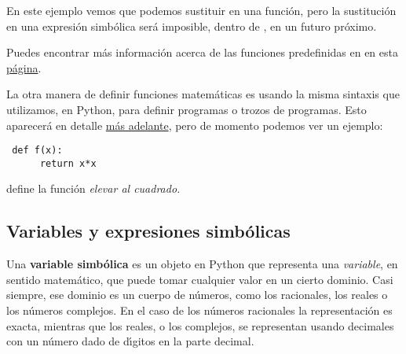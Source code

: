 En este ejemplo vemos que podemos sustituir en una funci\'on, pero la
sustituci\'on en una expresi\'on simb\'olica ser\'a imposible, dentro de
{\sage}, 
en un futuro
pr\'oximo.
 
 
Puedes encontrar m\'as informaci\'on acerca de las funciones predefinidas en
{\sage}  en esta
 \href{http://www.sagemath.org/doc/reference/functions/index.html}{p\'agina}.
 
 \medskip
 
 La otra manera de definir funciones matem\'aticas es usando la misma sintaxis
que utilizamos, en Python,  para definir programas o trozos de programas. Esto
aparecer\'a en detalle \hyperref[sect-funciones]{m\'as adelante}, pero de 
momento podemos ver un
ejemplo:
\begin{lstlisting}
 def f(x):
      return x*x
\end{lstlisting}
\noindent define la funci\'on {\itshape elevar al cuadrado.}






\subsection{Variables y expresiones simbólicas}

Una  \textbf{variable simbólica}  es un objeto en Python que representa una
{\itshape variable}, en sentido matem\'atico,  que
puede tomar cualquier valor en un cierto dominio. Casi siempre, ese dominio es
un cuerpo de n\'umeros, como los racionales, los reales o los n\'umeros
complejos. En el caso de los n\'umeros racionales la representaci\'on es exacta,
mientras que  los reales, o los complejos, se representan usando decimales con
un n\'umero dado de d\'{\i}gitos en la parte decimal.


